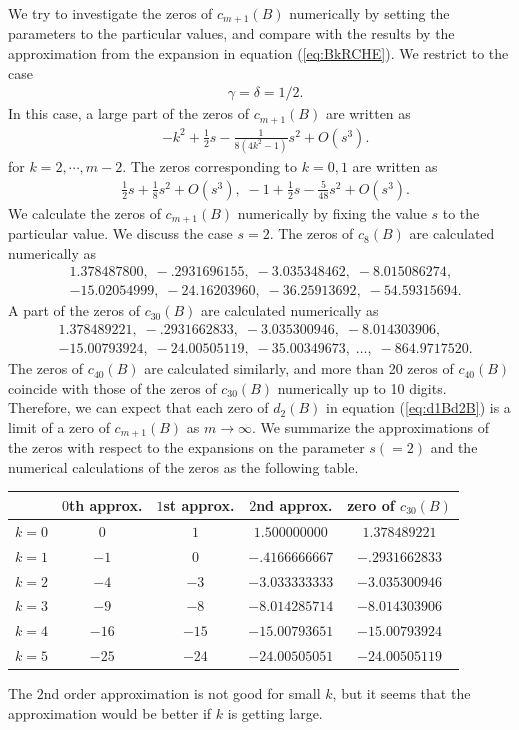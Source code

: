 \documentclass[12pt]{amsart}
\numberwithin{equation}{section}
\theoremstyle{definition}
\theoremstyle{remark}
\begin{document}
We try to investigate the zeros of $c_{m+1} (B)$ numerically by setting the parameters to the particular values, and compare with the results by the approximation from the expansion in equation (\ref{eq:BkRCHE}).
We restrict to the case
\begin{align}
& \gamma =\delta = 1/2 .
\end{align}
In this case, a large part of the zeros of $c_{m+1} (B) $ are written as
\begin{align}
&  -k^2+ \frac{1}{2} s - \frac{1}{8(4 k^2 -1) } s^2 + O(s^3) .
\end{align}
for $k= 2,\cdots, m-2  $.
The zeros corresponding to $k=0,1$ are written as
\begin{align}
& \frac{1}{2} s + \frac{1}{8 } s^2 + O(s^3) , \;  -1 +\frac{1}{2} s - \frac{5 }{48} s^2 + O(s^3) .
\end{align}
We calculate the zeros of $c_{m+1} (B)$ numerically by fixing the value $s$ to the particular value.
We discuss the case $s=2$.
The zeros of $c_{8} (B)$ are calculated numerically as
\begin{align*}
& 1.378487800, \; -.2931696155, \; -3.035348462, \; -8.015086274, \\
& -15.02054999 , \; -24.16203960, \; -36.25913692, \; -54.59315694.
\end{align*}
A part of the zeros of $c_{30} (B)$ are calculated numerically as
\begin{align*}
& 1.378489221, \; -.2931662833, \; -3.035300946, \; -8.014303906, \\
& -15.00793924 , \; -24.00505119, \; -35.00349673, \; \dots , \; -864.9717520 .
\end{align*}
The zeros of $c_{40} (B)$ are calculated similarly, and more than 20 zeros of $c_{40} (B)$ coincide with those of the zeros of $c_{30} (B)$ numerically up to 10 digits.
Therefore, we can expect that each zero of $d_2 (B)$ in equation (\ref{eq:d1Bd2B}) is a limit of a zero of $c_{m+1} (B)$ as $m \to \infty $.
We summarize the approximations of the zeros with respect to the expansions on the parameter $s(=2)$ and the numerical calculations of the zeros as the following table.
\begin{center}
\begin{tabular}{c|c|c|c|c}
& $0$th approx. & $1$st approx. & $2$nd approx. & zero of $ c_{30} (B) $ \\ \hline
$k=0$ & $0$ & $1 $ & $1.500000000 $ & $1.378489221$ \\
$k=1$ & $-1$ & $0 $ & $-.4166666667 $ & $-.2931662833$ \\
$k=2$ & $-4$ & $-3 $ & $-3.033333333 $ & $-3.035300946$ \\
$k=3$ & $-9$ & $-8 $ & $-8.014285714 $ & $-8.014303906$ \\
$k=4$ & $-16$ & $-15 $ & $-15.00793651 $ & $-15.00793924$ \\
$k=5$ & $-25$ & $-24 $ & $-24.00505051 $ & $-24.00505119$
\end{tabular}
\end{center}
The $2$nd order approximation is not good for small $k$, but it seems that the approximation would be better if $k$ is getting large.
\end{document}
